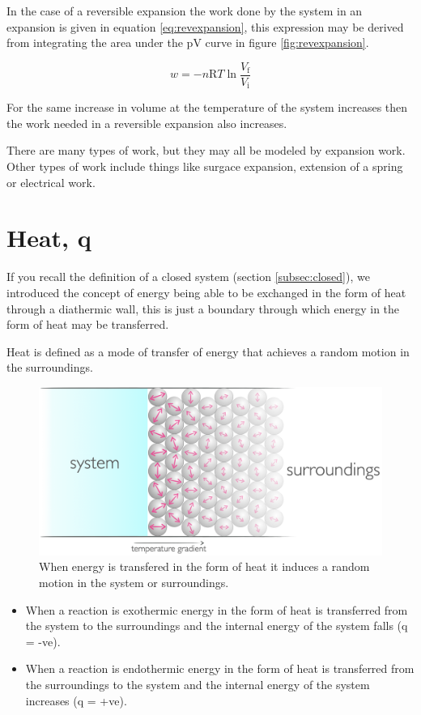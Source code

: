 \documentclass[
]{book}
\begin{document}
In the case of a reversible expansion the work done by the system in an expansion is given in equation \eqref{eq:revexpansion}, this expression may be derived from integrating the area under the pV curve in figure \ref{fig:revexpansion}.

\begin{equation}
w=-n\textrm{R}T \ln {\frac{V_\textrm{f}}{V_\textrm{i}}}
\label{eq:revexpansion}
\end{equation}

For the same increase in volume at the temperature of the system increases then the work needed in a reversible expansion also increases.

There are many types of work, but they may all be modeled by expansion work. Other types of work include things like surgace expansion, extension of a spring or electrical work.

\hypertarget{sec:heat}{%
\section{Heat, q}\label{sec:heat}}

If you recall the definition of a closed system (section \ref{subsec:closed}), we introduced the concept of energy being able to be exchanged in the form of heat through a diathermic wall, this is just a boundary through which energy in the form of heat may be transferred.

Heat is defined as a mode of transfer of energy that achieves a random motion in the surroundings.

\begin{figure}

{\centering \includegraphics[width=0.5\linewidth]{images/heat} 

}

\caption{When energy is transfered in the form of heat it induces a random motion in the system or surroundings.}\label{fig:heat}
\end{figure}

\begin{itemize}
\item
  When a reaction is exothermic energy in the form of heat is transferred from the system to the surroundings and the internal energy of the system falls (q = -ve).
\item
  When a reaction is endothermic energy in the form of heat is transferred from the surroundings to the system and the internal energy of the system increases (q = +ve).
\end{itemize}
\end{document}
